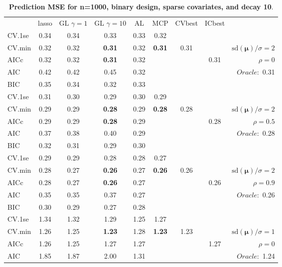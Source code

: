 \clearpage
\begin{table}\vspace{-.5cm}
\caption[l]{ { \bf Prediction MSE for n=1000, binary design, 
sparse covariates, and  decay  10}.}
\vspace{-.5cm}
\footnotesize{}
\begin{center}
\begin{tabular}{l*{7}{c}|r}
 & lasso & GL $\gamma=1$ & GL $\gamma=10$ & AL & MCP  & CVbest & ICbest  \\
\cline{1-9}
CV.1se & 0.34 & 0.34 & 0.33 & 0.33 & 0.32 & & & \\
CV.min & 0.32 & 0.32 & {\bf 0.31} & 0.32 & {\bf 0.31} & 0.31 & & $\mathrm{sd}(\mathbf{\mu})/\sigma=2$ \\
AICc & 0.32 & 0.32 & {\bf 0.31} & 0.32 & & & 0.31 &  $\rho=0$ \\
AIC & 0.42 & 0.42 & 0.45 & 0.32 & & & &  \multirow{2}{*}{$Oracle: $ 0.31} \\
BIC & 0.35 & 0.34 & 0.32 & 0.33 & & & &  \\
 \hline 
CV.1se & 0.31 & 0.30 & 0.29 & 0.30 & 0.29 & & & \\
CV.min & 0.29 & 0.29 & {\bf 0.28} & 0.29 & {\bf 0.28} & 0.28 & & $\mathrm{sd}(\mathbf{\mu})/\sigma=2$ \\
AICc & 0.29 & 0.29 & {\bf 0.28} & 0.29 & & & 0.28 &  $\rho=0.5$ \\
AIC & 0.37 & 0.38 & 0.40 & 0.29 & & & &  \multirow{2}{*}{$Oracle: $ 0.28} \\
BIC & 0.32 & 0.31 & 0.29 & 0.30 & & & &  \\
 \hline 
CV.1se & 0.29 & 0.29 & 0.28 & 0.28 & 0.27 & & & \\
CV.min & 0.28 & 0.27 & {\bf 0.26} & 0.27 & {\bf 0.26} & 0.26 & & $\mathrm{sd}(\mathbf{\mu})/\sigma=2$ \\
AICc & 0.28 & 0.27 & {\bf 0.26} & 0.27 & & & 0.26 &  $\rho=0.9$ \\
AIC & 0.35 & 0.35 & 0.37 & 0.27 & & & &  \multirow{2}{*}{$Oracle: $ 0.26} \\
BIC & 0.30 & 0.29 & 0.27 & 0.28 & & & &  \\
 \hline 
CV.1se & 1.34 & 1.32 & 1.29 & 1.25 & 1.27 & & & \\
CV.min & 1.26 & 1.25 & {\bf 1.23} & 1.28 & {\bf 1.23} & 1.23 & & $\mathrm{sd}(\mathbf{\mu})/\sigma=1$ \\
AICc & 1.26 & 1.25 & 1.27 & 1.27 & & & 1.27 &  $\rho=0$ \\
AIC & 1.85 & 1.87 & 2.00 & 1.31 & & & &  \multirow{2}{*}{$Oracle: $ 1.24} \\

\end{tabular}
\end{center}
\end{table}
